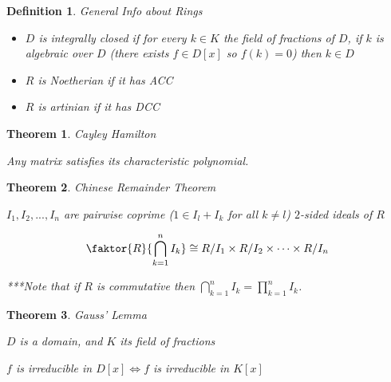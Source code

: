 \documentclass[12pt]{Qual}
\newtheorem{theorem}{Theorem}
\newtheorem{definition}{Definition}
\begin{document}
\vspace{0.5cm}
\begin{definition}{\Large\textit{General Info about Rings}}
$\,$

\begin{itemize}
\renewcommand\labelitemi{\faCoffee}
    \item $D$ is integrally closed if for every $k\in K$ the field of fractions of $D$, if $k$ is algebraic over $D$ (there exists $f\in D[x]$ so $f(k)=0$) then $k\in D$
    \item $R$ is Noetherian if it has ACC
    \item $R$ is artinian if it has DCC
\end{itemize}

\end{definition}
\vspace{0.5cm}
\begin{theorem}{\Large\textit{Cayley Hamilton}}

Any matrix satisfies its characteristic polynomial.

\end{theorem}
\vspace{0.5cm}
\begin{theorem}{\Large\textit{Chinese Remainder Theorem}}

 \begin{minipage}{0.85\textwidth}
\vspace{0.45cm}
$I_1,I_2,...,I_n$ are pairwise coprime ($1\in I_l+I_k$ for all $k\not=l$) $2$-sided ideals of $R$
\end{minipage}

 $$\faktor{R}{\bigcap_{k=1}^nI_k}\cong R/I_1\times R/I_2\times\cdots\times R/I_n$$

\begin{mybox}
***Note that if $R$ is commutative then $\bigcap_{k=1}^nI_k=\prod_{k=1}^nI_k$.
\end{mybox}

\end{theorem}
\vspace{0.5cm}
\begin{theorem}{\Large\textit{Gauss' Lemma}}

 $D$ is a domain, and $K$ its field of fractions

 $f$ is irreducible in $D[x] \iff f$ is irreducible in $K[x]$

\end{theorem}
\end{document}
